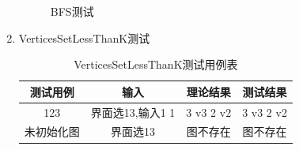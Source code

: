 \documentclass[supercite]{HustGraduPaper}
\theoremstyle{definition}
\begin{document}
\begin{enumerate}
\begin{figure}[htb]
		      \caption{BFS测试}
	      \end{figure}
	      \newpage
	\item VerticesSetLessThanK测试
	      \begin{table}[htb]
		      \begin{center}
			      \setlength{\tabcolsep}{2.0mm}
			      \caption{VerticesSetLessThanK测试用例表}
			      \label{t13}
			      \begin{tabular}{|c|c|c|c|}
				      \hline
				      测试用例   & 输入             & 理论结果  & 测试结果  \\
				      \hline
				      \hline
				      123        & 界面选13,输入1 1 & 3 v3 2 v2 & 3 v3 2 v2 \\
				      \hline
				      未初始化图 & 界面选13         & 图不存在  & 图不存在  \\
				      \hline
			      \end{tabular}
		      \end{center}
	      \end{table}
	      \begin{figure}[htb]
		      \centering
		      \quad
		      \\

\end{figure}
\end{enumerate}
\end{document}
